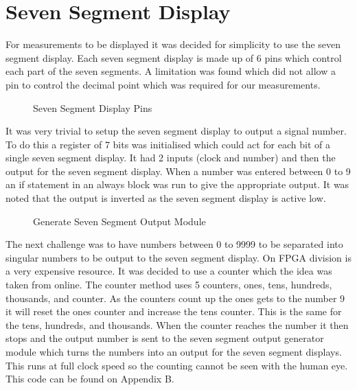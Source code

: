 \documentclass[a4paper,12pt]{article}
\begin{document}
\section{Seven Segment Display}
\begin{flushleft}
For measurements to be displayed it was decided for simplicity to use the seven segment display. Each seven segment display is made up of 6 pins which control each part of the seven segments. A limitation was found which did not allow a pin to control the decimal point which was required for our measurements. 
\begin{figure}[H]
	\centering
	\caption{Seven Segment Display Pins \cite{terasic_2014}}
\end{figure}
It was very trivial to setup the seven segment display to output a signal number. To do this a register of 7 bits was initialised which could act for each bit of a single seven segment display. It had 2 inputs (clock and number) and then the output for the seven segment display. When a number was entered between 0 to 9 an if statement in an always block was run to give the appropriate output. It was noted that the output is inverted as the seven segment display is active low. 
\begin{figure}[H]
	\centering
	
		\caption{Generate Seven Segment Output Module}
\end{figure}
The next challenge was to have numbers between 0 to 9999 to be separated into singular numbers to be output to the seven segment display. On FPGA division is a very expensive resource. It was decided to use a counter which the idea was taken from online. \cite{stack_overflow} The counter method uses 5 counters, ones, tens, hundreds, thousands, and counter. As the counters count up the ones gets to the number 9 it will reset the ones counter and increase the tens counter. This is the same for the tens, hundreds, and thousands. When the counter reaches the number it then stops and the output number is sent to the seven segment output generator module which turns the numbers into an output for the seven segment displays. This runs at full clock speed so the counting cannot be seen with the human eye. This code can be found on Appendix B.
\end{flushleft}
\newpage
\end{document}
